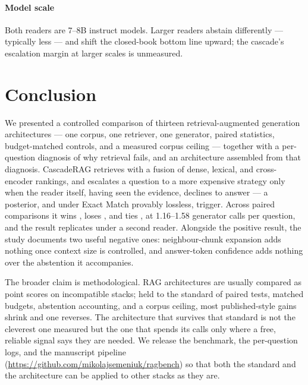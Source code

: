 \paragraph{Model scale} Both readers are 7--8B instruct models. Larger
readers abstain differently --- typically less --- and shift the
closed-book bottom line upward; the cascade's escalation margin at larger
scales is unmeasured.

\section{Conclusion}
\label{sec:conclusion}

We presented a controlled comparison of thirteen retrieval-augmented
generation architectures --- one corpus, one retriever, one generator,
paired statistics, budget-matched controls, and a measured corpus ceiling
--- together with a per-question diagnosis of why retrieval fails, and an
architecture assembled from that diagnosis. CascadeRAG retrieves with a
fusion of dense, lexical, and cross-encoder rankings, and escalates a
question to a more expensive strategy only when the reader itself, having
seen the evidence, declines to answer --- a posterior, and under Exact
Match provably lossless, trigger. Across \ResultPairs{} paired
comparisons it wins \ResultWins{}, loses \ResultLosses{}, and ties
\ResultTies{}, at 1.16--1.58 generator calls per question, and the result
replicates under a second reader. Alongside the positive result, the
study documents two useful negative ones: neighbour-chunk expansion adds
nothing once context size is controlled, and answer-token confidence adds
nothing over the abstention it accompanies.

The broader claim is methodological. RAG architectures are usually
compared as point scores on incompatible stacks; held to the standard of
paired tests, matched budgets, abstention accounting, and a corpus
ceiling, most published-style gains shrink and one reverses. The
architecture that survives that standard is not the cleverest one
measured but the one that spends its calls only where a free, reliable
signal says they are needed. We release the benchmark, the per-question
logs, and the manuscript pipeline
(\url{https://github.com/mikolajsemeniuk/ragbench}) so that both the
standard and the architecture can be applied to other stacks as they are.
